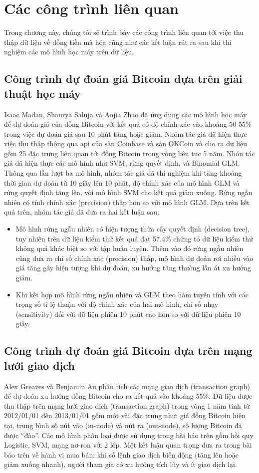 \chapter{Các công trình liên quan} \label{chap-Related_work}
Trong chương này, chúng tôi sẽ trình bày các công trình liên quan tới việc thu thập dữ liệu về đồng tiền mã hóa cũng như các kết luận rút ra sau khi thí nghiệm các mô hình học máy trên dữ liệu.
\section{Công trình dự đoán giá Bitcoin dựa trên giải thuật học máy}
Isaac Madan, Shaurya Saluja và Aojia Zhao %
\cite{paper-automated-bitcoin-trading}
đã ứng dụng các mô hình học máy để dự đoán giá của đồng Bitcoin với kết quả có độ chính xác vào khoảng 50-55\% trong việc dự đoán giá sau 10 phút tăng hoặc giảm. Nhóm tác giả đã hiện thực việc thu thập thông qua api của sàn Coinbase và sàn OKCoin và cho ra dữ liệu gồm 25 đặc trưng liên quan tới đồng Bitcoin trong vòng liên tục 5 năm. Nhón tác giả đã hiện thực các mô hình như SVM, rừng quyết định, và Binomial GLM. Thông qua lần lượt ba mô hình, nhóm tác giả đã thí nghiệm khi tăng khoảng thời gian dự đoán từ 10 giây lên 10 phút, độ chính xác của mô hình GLM và rừng quyết định tăng lên, với mô hình SVM cho kết quả giảm xuống. Rừng ngẫu nhiên có tính chính xác (precision) thấp hơn so với mô hình GLM.  Dựa trên kết quả trên, nhóm tác giả đã đưa ra hai kết luận sau:
\begin{itemize}
    \item Mô hình rừng ngẫu nhiên có hiện tượng thừa cây quyết định (decision tree), tuy nhiên trên dữ liệu kiểm thử kết quả đạt 57.4\%  chứng tỏ dữ liệu kiểm thử không quá khác biệt so với tập huấn luyện. Thêm vào đó rừng ngẫu nhiên cũng đưa ra chỉ số chính xác (precision) thấp, mô hình dự đoán rơi nhiều vào giá tăng gây hiện tượng khi dự đoán, xu hướng tăng thường lấn át xu hướng giảm.
    \item Khi kết hợp mô hình rừng ngẫu nhiên và GLM theo hàm tuyến tính với các trọng số tỉ lệ thuận với độ chính xác của hai mô hình, chỉ số nhạy (sensitivity) đối với dữ liệu phiên 10 phút cao hơn so với dữ liệu phiên 10 giây.
\end{itemize}
\section{Công trình dự đoán giá Bitcoin dựa trên mạng lưới giao dịch}
Alex Greaves và Benjamin Au \cite{paper-Bitcoin-Transaction-Graph} phân tích các mạng giao dịch (transaction graph) để dự đoán xu hướng đồng Bitcoin cho ra kết quả vào khoảng 55\%. Dữ liệu được thu thập trên mạng lưới giao dịch (transaction graph) trong vòng 1 năm tính từ 2012/01/01 đến 2013/01/01 gốm một vài đặc trưng như: giá đồng Bitcoin hiện tại, trung bình số nút vào (in-node) và nút ra (out-node), số lượng Bitcoin đã được ``đào''. Các mô hình phân loại được sử dụng trong bài báo trên gồm hồi quy Logistic, SVM, mạng nơ-ron với 2 lớp. Một kết luận quan trọng đưa ra trong bài báo trên về hành vi mua bán: khi số lệnh giao dịch biến động (tăng lên hoặc giảm xuống nhanh), người tham gia có xu hướng tích lũy và ít giao dịch lại.

